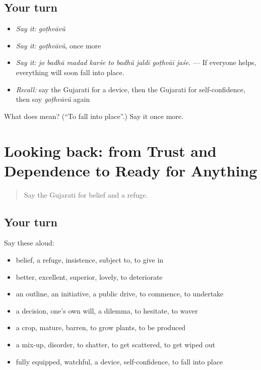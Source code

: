 \subsection*{Your turn}
\begin{itemize}
\raggedright
  \item \emph{Say it:} \emph{goṭhvāvũ}
  \item \emph{Say it:} \emph{goṭhvāvũ}, once more
  \item \emph{Say it:} \emph{jo badhā madad karśe to badhũ jaldī goṭhvāī jaśe.} — If everyone helps, everything will soon fall into place.
  \item \emph{Recall:} say the Gujarati for a device, then the Gujarati for self-confidence, then say \emph{goṭhvāvũ} again
\end{itemize}

\begin{tcolorbox}[breakable,colback=teal!4,colframe=teal!35!black,title={Before you move on}]
What does  mean? (\textquotedblleft{}To fall into place\textquotedblright{}.) Say it once more.
\end{tcolorbox}
\section[(dialogue)]{Looking back: from Trust and Dependence to Ready for Anything}

\label{lesson:GU-R392-review-386-392}



\begin{quote}
Say the Gujarati for belief and a refuge.
\end{quote}

\subsection*{Your turn}
Say these aloud:

\begin{itemize}
\raggedright
  \item belief, a refuge, insistence, subject to, to give in
  \item better, excellent, superior, lovely, to deteriorate
  \item an outline, an initiative, a public drive, to commence, to undertake
  \item a decision, one's own will, a dilemma, to hesitate, to waver
  \item a crop, mature, barren, to grow plants, to be produced
  \item a mix-up, disorder, to shatter, to get scattered, to get wiped out
  \item fully equipped, watchful, a device, self-confidence, to fall into place
\end{itemize}

